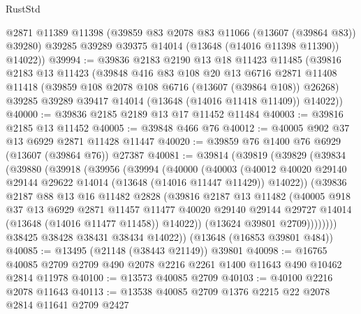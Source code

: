 \begin{lexlean}{RustStd}
\begin{coremodule}
        @2871
        @11389
        @11398
        (@39859 @83 @2078 @83 @11066 (@13607 (@39864 @83)) @39280)
        @39285
        @39289
        @39375
        @14014
        (@13648 (@14016 @11398 @11390))
        @14022))
@39994 := @39836
    @2183
    @2190
    @13
    @18
    @11423
    @11485
    (@39816
      @2183
      @13
      @11423
      (@39848
        @416
        @83
        @108
        @20
        @13
        @6716
        @2871
        @11408
        @11418
        (@39859 @108 @2078 @108 @6716 (@13607 (@39864 @108)) @26268)
        @39285
        @39289
        @39417
        @14014
        (@13648 (@14016 @11418 @11409))
        @14022))
@40000 := @39836 @2185 @2189 @13 @17 @11452 @11484
@40003 := @39816 @2185 @13 @11452
@40005 := @39848 @466 @76
@40012 := @40005 @902 @37 @13 @6929 @2871 @11428 @11447
@40020 := @39859 @76 @1400 @76 @6929 (@13607 (@39864 @76)) @27387
@40081 := @39814
    (@39819
      (@39829
        (@39834
          (@39880
            (@39918
              (@39956
                (@39994
                  (@40000
                    (@40003
                      (@40012
                        @40020
                        @29140
                        @29144
                        @29622
                        @14014
                        (@13648 (@14016 @11447 @11429))
                        @14022))
                    (@39836
                      @2187
                      @88
                      @13
                      @16
                      @11482
                      @2828
                      (@39816
                        @2187
                        @13
                        @11482
                        (@40005
                          @918
                          @37
                          @13
                          @6929
                          @2871
                          @11457
                          @11477
                          @40020
                          @29140
                          @29144
                          @29727
                          @14014
                          (@13648 (@14016 @11477 @11458))
                          @14022))
                      (@13624 @39801 @2709))))))))
        @38425
        @38428
        @38431
        @38434
        @14022))
    (@13648 (@16853 @39801 @484))
@40085 := @13495 (@21148 (@38443 @21149)) @39801
@40098 := @16765 @40085 @2709 @2709 @490 @2078 @2216 @2261 @1400 @11643 @490 @10462 @2814 @11978
@40100 := @13573 @40085 @2709
@40103 := @40100 @2216 @2078 @11643
@40113 := @13538 @40085 @2709 @1376 @2215 @22 @2078 @2814 @11641 @2709 @2427

\end{coremodule}
\end{lexlean}
